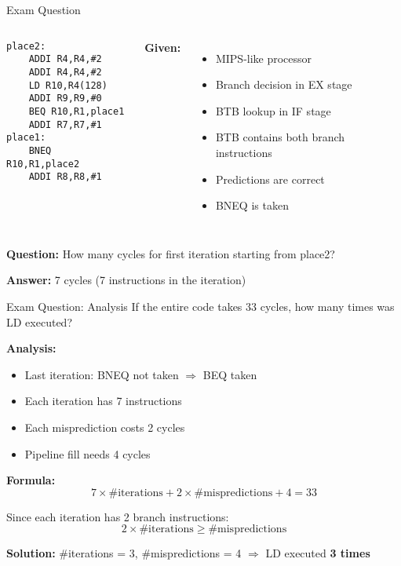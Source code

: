\documentclass[aspectratio=169,12pt]{beamer}
\begin{document}
\begin{frame}[fragile]{Exam Question}
\begin{columns}
\begin{lstlisting}[language={[x86masm]Assembler}]
place2: 
    ADDI R4,R4,#2
    ADDI R4,R4,#2
    LD R10,R4(128)
    ADDI R9,R9,#0
    BEQ R10,R1,place1
    ADDI R7,R7,#1
place1: 
    BNEQ R10,R1,place2
    ADDI R8,R8,#1
\end{lstlisting}

\textbf{Given:}
\begin{itemize}
    \item MIPS-like processor
    \item Branch decision in EX stage
    \item BTB lookup in IF stage
    \item BTB contains both branch instructions
    \item Predictions are correct
    \item BNEQ is taken
\end{itemize}
\end{columns}

\vspace{0.3cm}
\textbf{Question:} How many cycles for first iteration starting from place2?

\textbf{Answer:} 7 cycles (7 instructions in the iteration)
\end{frame}

\begin{frame}{Exam Question: Analysis}
\textbf{} If the entire code takes 33 cycles, how many times was LD executed?

\textbf{Analysis:}
\begin{itemize}
    \item Last iteration: BNEQ not taken $\Rightarrow$ BEQ taken
    \item Each iteration has 7 instructions
    \item Each misprediction costs 2 cycles
    \item Pipeline fill needs 4 cycles
\end{itemize}

\textbf{Formula:}
$$7 \times \text{\#iterations} + 2 \times \text{\#mispredictions} + 4 = 33$$

Since each iteration has 2 branch instructions:
$$2 \times \text{\#iterations} \geq \text{\#mispredictions}$$

\textbf{Solution:} \#iterations = 3, \#mispredictions = 4
$\Rightarrow$ LD executed \textbf{3 times}
\end{frame}
\end{document}
